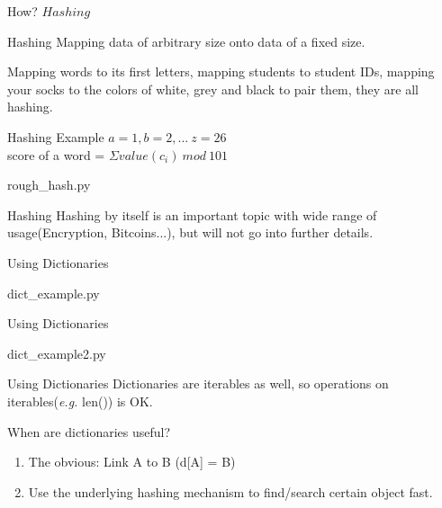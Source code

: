 \documentclass{beamer}
\begin{document}
\begin{frame}{How?}
  $Hashing$
\end{frame}

\begin{frame}{Hashing}
  Mapping data of arbitrary size onto data of a fixed size.

  Mapping words to its first letters, mapping students to student IDs,
  mapping your socks to the colors of white, grey and black to pair them, they are all hashing.
\end{frame}

\begin{frame}{Hashing Example}
  $a=1, b=2, ...\ z=26$\\
  score of a word = $\Sigma value(c_i)\ mod\ 101$
  \begin{lstinputlisting}
    {rough_hash.py}
  \end{lstinputlisting}
\end{frame}

\begin{frame}{Hashing}
  Hashing by itself is an important topic with wide range of usage(Encryption,
  Bitcoins...), but will not go into further details.
\end{frame}

\begin{frame}{Using Dictionaries}
  \begin{lstinputlisting}
    {dict_example.py}
  \end{lstinputlisting}
\end{frame}

\begin{frame}{Using Dictionaries}
  \begin{lstinputlisting}
    {dict_example2.py}
  \end{lstinputlisting}
\end{frame}

\begin{frame}{Using Dictionaries}
  Dictionaries are iterables as well, so operations on iterables(\textit{e.g.}
  len()) is OK.
\end{frame}

\begin{frame}{When are dictionaries useful?}
  \begin{enumerate}
    \item The obvious: Link A to B (d[A] = B)
    \item Use the underlying hashing mechanism to find/search certain object
      fast.
  \end{enumerate}
\end{frame}
\end{document}

